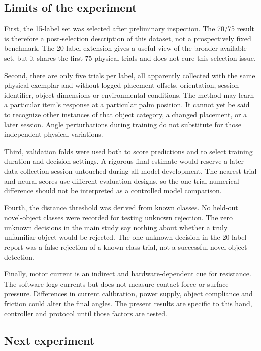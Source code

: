 \documentclass[12pt,a4paper]{article}
\begin{document}
\subsection{Limits of the experiment}

First, the 15-label set was selected after preliminary inspection. The 70/75 result is therefore a post-selection description of this dataset, not a prospectively fixed benchmark. The 20-label extension gives a useful view of the broader available set, but it shares the first 75 physical trials and does not cure this selection issue.

Second, there are only five trials per label, all apparently collected with the same physical exemplar and without logged placement offsets, orientation, session identifier, object dimensions or environmental conditions. The method may learn a particular item's response at a particular palm position. It cannot yet be said to recognize other instances of that object category, a changed placement, or a later session. Angle perturbations during training do not substitute for those independent physical variations.

Third, validation folds were used both to score predictions and to select training duration and decision settings. A rigorous final estimate would reserve a later data collection session untouched during all model development. The nearest-trial and neural scores use different evaluation designs, so the one-trial numerical difference should not be interpreted as a controlled model comparison.

Fourth, the distance threshold was derived from known classes. No held-out novel-object classes were recorded for testing unknown rejection. The zero unknown decisions in the main study say nothing about whether a truly unfamiliar object would be rejected. The one unknown decision in the 20-label report was a false rejection of a known-class trial, not a successful novel-object detection.

Finally, motor current is an indirect and hardware-dependent cue for resistance. The software logs currents but does not measure contact force or surface pressure. Differences in current calibration, power supply, object compliance and friction could alter the final angles. The present results are specific to this hand, controller and protocol until those factors are tested.

\subsection{Next experiment}
\end{document}
